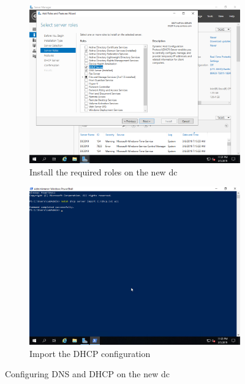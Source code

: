 \begin{figure}[!htb]\ContinuedFloat
	\begin{subfigure}{0.5\textwidth}
		\captionsetup{width=0.8\linewidth}
		\includegraphics[width=0.9\linewidth]{img/Methodologie/Migration26.png}
		\centering
		\caption{ Install the required roles on the new \acrshort{dc}}
	\end{subfigure}
	\begin{subfigure}{0.5\textwidth}
		\captionsetup{width=0.8\linewidth}
		\includegraphics[width=0.9\linewidth]{img/Methodologie/Migration27.png} 
		\centering	
		\caption{Import the DHCP configuration}
	\end{subfigure}
	\caption[Configuring DHCP \& DNS]{Configuring DNS and DHCP on the new \acrshort{dc}}
	\label{fig:DNSDHCP}
\end{figure}
\clearpage
